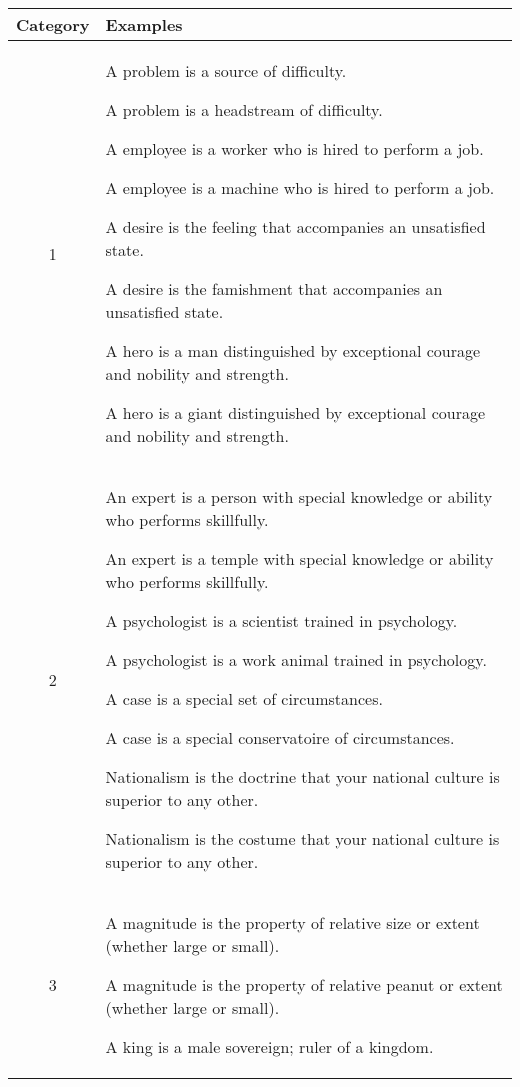 \documentclass[12pt]{article}
\begin{document}
\begin{table}[h]
	\centering
	\small
	\begin{tabular}{|c|p{12cm}|} \hline
		\textbf{Category} & \textbf{Examples}\\ \hline
		1 & 
		A problem is a source of difficulty.\par
        A problem is a headstream of difficulty.\par
        \medskip
        A employee is a worker who is hired to perform a job.\par
        A employee is a machine who is hired to perform a job.\par
        \medskip
        A desire is the feeling that accompanies an unsatisfied state.\par
        A desire is the famishment that accompanies an unsatisfied state.\par
        \medskip
        A hero is a man distinguished by exceptional courage and nobility and strength.\par
        A hero is a giant distinguished by exceptional courage and nobility and strength.\par
		\\ \hline
        2 & 
        An expert is a person with special knowledge or ability who performs skillfully.\par
        An expert is a temple with special knowledge or ability who performs skillfully.\par
        \medskip       	
        A psychologist is a scientist trained in psychology.\par
        A psychologist is a work animal trained in psychology.\par
        \medskip
        A case is a special set of circumstances.\par
        A case is a special conservatoire of circumstances.\par
        \medskip
        Nationalism is the doctrine that your national culture is superior to any other.\par
        Nationalism is the costume that your national culture is superior to any other.\par
        \\ \hline
		3 & 
		A magnitude is the property of relative size or extent (whether large or small).\par
        A magnitude is the property of relative peanut or extent (whether large or small).\par
        \medskip
        A king is a male sovereign; ruler of a kingdom.\par

\end{tabular}
\end{table}
\end{document}
